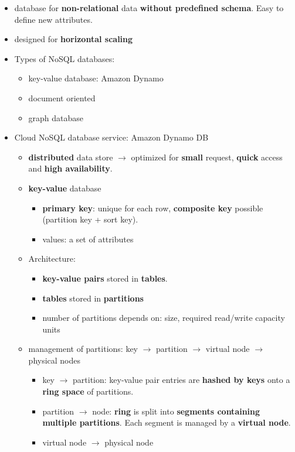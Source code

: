 \begin{itemize}
	\item database for \textbf{non-relational} data \textbf{without predefined schema}. Easy to define new attributes.
	\item designed for \textbf{horizontal scaling}
	\item Types of NoSQL databases:
	\begin{itemize}
		\item key-value database: Amazon Dynamo
		\item document oriented
		\item graph database
	\end{itemize}
	\item Cloud NoSQL database service: Amazon Dynamo DB
	\begin{itemize}
		\item \textbf{distributed} data store $\rightarrow$ optimized for \textbf{small} request, \textbf{quick} access and \textbf{high availability}.
		\item \textbf{key-value} database
		\begin{itemize}
			\item \textbf{primary key}: unique for each row, \textbf{composite key} possible (partition key + sort key).
			\item values: a set of attributes
		\end{itemize}
		\item Architecture:
		\begin{itemize}
			\item \textbf{key-value pairs} stored in \textbf{tables}. 
			\item \textbf{tables} stored in \textbf{partitions}
			\item number of partitions depends on: size, required read/write capacity units
		\end{itemize}
		\item management of partitions: key $\rightarrow$ partition $\rightarrow$ virtual node $\rightarrow$ physical nodes
		\begin{itemize}
			\item key $\rightarrow$ partition: key-value pair entries are \textbf{hashed by keys} onto a \textbf{ring space} of partitions.
			\item partition $\rightarrow$ node: \textbf{ring} is split into \textbf{segments containing multiple partitions}. Each segment is managed by a \textbf{virtual node}.
			\item virtual node $\rightarrow$ physical node

\end{itemize}
\end{itemize}
\end{itemize}
